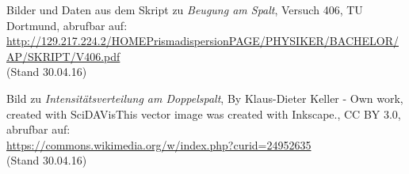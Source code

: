 Bilder und Daten aus dem Skript zu \emph{Beugung am Spalt}, Versuch 406, TU Dortmund, abrufbar auf:\\
\url{http://129.217.224.2/HOMEPrismadispersionPAGE/PHYSIKER/BACHELOR/AP/SKRIPT/V406.pdf}\\(Stand 30.04.16)\par

Bild zu \emph{Intensitätsverteilung am Doppelspalt}, By Klaus-Dieter Keller - Own work, created with SciDAVisThis vector image was created with Inkscape., CC BY 3.0,
abrufbar auf: \\
\url{https://commons.wikimedia.org/w/index.php?curid=24952635 }\\ (Stand 30.04.16)

